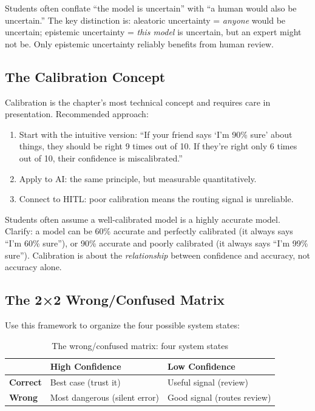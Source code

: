 \begin{keyconcept}
Students often conflate ``the model is uncertain'' with ``a human would also be uncertain.'' The key distinction is: aleatoric uncertainty = \emph{anyone} would be uncertain; epistemic uncertainty = \emph{this model} is uncertain, but an expert might not be. Only epistemic uncertainty reliably benefits from human review.
\end{keyconcept}

\subsection{The Calibration Concept}

Calibration is the chapter's most technical concept and requires care in presentation. Recommended approach:

\begin{enumerate}
    \item Start with the intuitive version: ``If your friend says `I'm 90\% sure' about things, they should be right 9 times out of 10. If they're right only 6 times out of 10, their confidence is miscalibrated.''
    \item Apply to AI: the same principle, but measurable quantitatively.
    \item Connect to HITL: poor calibration means the routing signal is unreliable.
\end{enumerate}

\begin{cautionbox}
Students often assume a well-calibrated model is a highly accurate model. Clarify: a model can be 60\% accurate and perfectly calibrated (it always says ``I'm 60\% sure''), or 90\% accurate and poorly calibrated (it always says ``I'm 99\% sure''). Calibration is about the \emph{relationship} between confidence and accuracy, not accuracy alone.
\end{cautionbox}

\subsection{The 2×2 Wrong/Confused Matrix}

Use this framework to organize the four possible system states:

\begin{table}[htbp]
\caption{The wrong/confused matrix: four system states}
\label{tab:wrong-confused}
\centering
\begin{tabular}{@{}lll@{}}
\toprule
 & \textbf{High Confidence} & \textbf{Low Confidence} \\
\midrule
\textbf{Correct} & Best case (trust it) & Useful signal (review) \\
\textbf{Wrong} & Most dangerous (silent error) & Good signal (routes review) \\
\bottomrule
\end{tabular}
\end{table}

